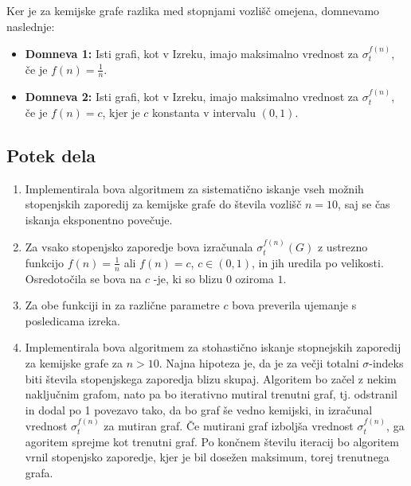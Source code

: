 \documentclass{article}
\begin{document}
Ker je za kemijske grafe razlika med stopnjami vozlišč omejena, domnevamo naslednje: 

\begin{itemize}
    \item \textbf{Domneva 1:} Isti grafi, kot v Izreku, imajo maksimalno vrednost za $\sigma_t^{f(n)}$, če je $f(n) = \frac{1}{n}$. 
    \item \textbf{Domneva 2:} Isti grafi, kot v Izreku, imajo maksimalno vrednost za $\sigma_t^{f(n)}$, če je $f(n) = c$, kjer je $c$ konstanta v intervalu $(0, 1)$. 

\end{itemize}


\subsection*{Potek dela}


\begin{enumerate}
    \item Implementirala bova algoritmem za sistematično iskanje vseh možnih stopenjskih zaporedij za 
    kemijske grafe do števila vozlišč $n=10$, saj se čas iskanja eksponentno povečuje.
    \item Za vsako stopenjsko zaporedje bova izračunala $\sigma_t^{f(n)}(G)$ z ustrezno funkcijo $f(n)= \frac{1}{n}$
     ali $f(n)= c$, $c \in (0,1)$, in jih uredila po velikosti. Osredotočila se bova na $c$ -je, ki so blizu $0$ oziroma $1$.
    \item Za obe funkciji in za različne parametre $c$ bova preverila ujemanje s 
    posledicama izreka. 
    \item Implementirala bova algoritmem za stohastično iskanje stopnejskih zaporedij za kemijske grafe za $n>10$.
    Najna hipoteza je, da je za večji totalni $\sigma$-indeks biti števila stopenjskega zaporedja blizu skupaj. 
    Algoritem bo začel z nekim naključnim grafom, nato pa bo iterativno mutiral trenutni graf, tj. odstranil in dodal po 1 povezavo tako, da bo graf še vedno kemijski,
    in izračunal vrednost $\sigma_t^{f(n)}$ za mutiran graf.
    Če mutirani graf izboljša vrednost $\sigma_t^{f(n)}$, ga agoritem sprejme kot trenutni graf.
    Po končnem številu iteracij bo algoritem vrnil stopenjsko zaporedje, kjer je bil dosežen maksimum, torej trenutnega grafa.

\end{enumerate}
\end{document}
